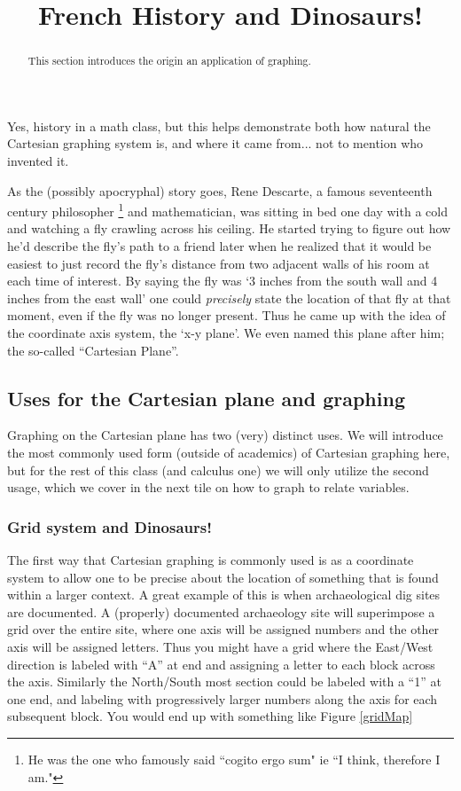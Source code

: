 \documentclass{ximeraXloud}
\title{French History and Dinosaurs!}
\begin{document}
\begin{abstract}
    This section introduces the origin an application of graphing.
\end{abstract}
\maketitle

Yes, history in a math class, but this helps demonstrate both how natural the Cartesian graphing system is, and where it came from... not to mention who invented it. 

As the (possibly apocryphal) story goes, Rene Descarte, a famous seventeenth century philosopher%
\footnote{
    He was the one who famously said ``cogito ergo sum" ie ``I think, therefore I am."
    }%
and mathematician, was sitting in bed one day with a cold and watching a fly crawling across his ceiling. He started trying to figure out how he'd describe the fly's path to a friend later when he realized that it would be easiest to just record the fly's distance from two adjacent walls of his room at each time of interest. By saying the fly was `3 inches from the south wall and 4 inches from the east wall' one could \textit{precisely} state the location of that fly at that moment, even if the fly was no longer present. Thus he came up with the idea of the coordinate axis system, the `x-y plane'. We even named this plane after him; the so-called ``Cartesian Plane''. 

\subsection*{Uses for the Cartesian plane and graphing}
    Graphing on the Cartesian plane has two (very) distinct uses. We will introduce the most commonly used form (outside of academics) of Cartesian graphing here, but for the rest of this class (and calculus one) we will only utilize the second usage, which we cover in the next tile on how to graph to relate variables.

    \subsubsection*{Grid system and Dinosaurs!}
        The first way that Cartesian graphing is commonly used is as a coordinate system to allow one to be precise about the location of something that is found within a larger context. A great example of this is when archaeological dig sites are documented. A (properly) documented archaeology site will superimpose a grid over the entire site, where one axis will be assigned numbers and the other axis will be assigned letters. Thus you might have a grid where the East/West direction is labeled with ``A'' at end and assigning a letter to each block across the axis. Similarly the North/South most section could be labeled with a ``1'' at one end, and labeling with progressively larger numbers along the axis for each subsequent block. You would end up with something like Figure \ref{gridMap}
        
\end{document}
